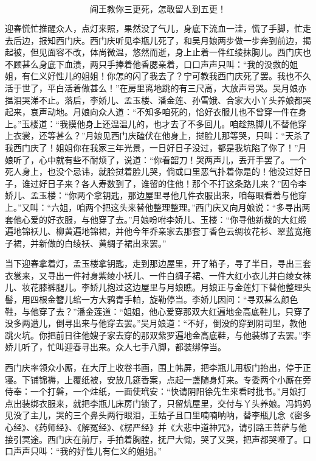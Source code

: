 \[
阎王教你三更死，怎敢留人到五更！
\]

迎春慌忙推醒众人，点灯来照，果然没了气儿，身底下流血一洼，慌了手脚，忙走去后边，报知西门庆。西门庆听见李瓶儿死了，和吴月娘两步做一步奔到前边，揭起被，但见面容不改，体尚微温，悠然而逝，身上止着一件红绫抹胸儿。西门庆也不顾甚么身底下血渍，两只手捧着他香腮亲着，口口声声只叫：“我的没救的姐姐，有仁义好性儿的姐姐！你怎的闪了我去了？宁可教我西门庆死了罢。我也不久活于世了，平白活着做甚么！”在房里离地跳的有三尺高，大放声号哭。吴月娘亦揾泪哭涕不止。落后，李娇儿、孟玉楼、潘金莲、孙雪娥、合家大小丫头养娘都哭起来，哀声动地。月娘向众人道：“不知多咱死的，恰好衣服儿也不曾穿一件在身上。”玉楼道：“我摸他身上还温温儿的，也才去了不多回儿。咱趁热脚儿不替他穿上衣裳，还等甚么？”月娘见西门庆磕伏在他身上，挝脸儿那等哭，只叫：“天杀了我西门庆了！姐姐你在我家三年光景，一日好日子没过，都是我坑陷了你了！”月娘听了，心中就有些不耐烦了，说道：“你看韶刀！哭两声儿，丢开手罢了。一个死人身上，也没个忌讳，就脸挝着脸儿哭，倘或口里恶气扑着你是的！他没过好日子，谁过好日子来？各人寿数到了，谁留的住他！那个不打这条路儿来？”因令李娇儿、孟玉楼：“你两个拿钥匙，那边屋里寻他几件衣服出来，咱每眼看着与他穿上。”又叫：“六姐，咱两个把这头来替他整理整理。”西门庆又向月娘说：“多寻出两套他心爱的好衣服，与他穿了去。”月娘吩咐李娇儿、玉楼：“你寻他新裁的大红缎遍地锦袄儿、柳黄遍地锦裙，并他今年乔亲家去那套丁香色云绸妆花衫、翠蓝宽拖子裙，并新做的白绫袄、黄绸子裙出来罢。”

当下迎春拿着灯，孟玉楼拿钥匙，走到那边屋里，开了箱子，寻了半日，寻出三套衣裳来，又寻出一件衬身紫绫小袄儿、一件白绸子裙、一件大红小衣儿并白绫女袜儿、妆花膝裤腿儿。李娇儿抱过这边屋里与月娘瞧。月娘正与金莲灯下替他整理头髻，用四根金簪儿绾一方大鸦青手帕，旋勒停当。李娇儿因问：“寻双甚么颜色鞋，与他穿了去？”潘金莲道：“姐姐，他心爱穿那双大红遍地金高底鞋儿，只穿了没多两遭儿，倒寻出来与他穿去罢。”吴月娘道：“不好，倒没的穿到阴司里，教他跳火坑。你把前日往他嫂子家去穿的那双紫罗遍地金高底鞋，与他装绑了去罢。”李娇儿听了，忙叫迎春寻出来。众人七手八脚，都装绑停当。

西门庆率领众小厮，在大厅上收卷书画，围上帏屏，把李瓶儿用板门抬出，停于正寝。下铺锦褥，上覆纸被，安放几筵香案，点起一盏随身灯来。专委两个小厮在旁侍奉：一个打磐，一个炷纸，一面使玳安：“快请阴阳徐先生来看时批书。”月娘打点出装绑衣服来，就把李瓶儿床房门锁了，只留炕屋里，交付与丫头养娘。冯妈妈见没了主儿，哭的三个鼻头两行眼泪，王姑子且口里喃喃呐呐，替李瓶儿念《密多心经》、《药师经》、《解冤经》、《楞严经》并《大悲中道神咒》，请引路王菩萨与他接引冥途。西门庆在前厅，手拍着胸膛，抚尸大恸，哭了又哭，把声都哭哑了。口口声声只叫：“我的好性儿有仁义的姐姐。”

